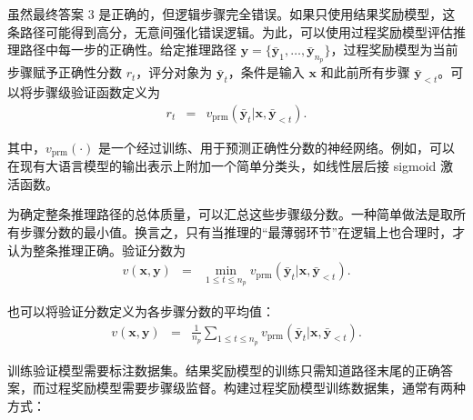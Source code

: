 虽然最终答案 $3$ 是正确的，但逻辑步骤完全错误。如果只使用结果奖励模型，这条路径可能得到高分，无意间强化错误逻辑。为此，可以使用过程奖励模型评估推理路径中每一步的正确性。给定推理路径 $\mathbf{y} = \{\bar{\mathbf{y}}_1, \dots, \bar{\mathbf{y}}_{n_p}\}$，过程奖励模型为当前步骤赋予正确性分数 $r_t$，评分对象为 $\bar{\mathbf{y}}_t$，条件是输入 $\mathbf{x}$ 和此前所有步骤 $\bar{\mathbf{y}}_{<t}$。可以将步骤级验证函数定义为
\begin{eqnarray}
r_t & = & v_{\mathrm{prm}}(\bar{\mathbf{y}}_t | \mathbf{x}, \bar{\mathbf{y}}_{<t}).
\end{eqnarray}

\noindent 其中，$v_{\mathrm{prm}}(\cdot)$ 是一个经过训练、用于预测正确性分数的神经网络。例如，可以在现有大语言模型的输出表示上附加一个简单分类头，如线性层后接 sigmoid 激活函数。

为确定整条推理路径的总体质量，可以汇总这些步骤级分数。一种简单做法是取所有步骤分数的最小值。换言之，只有当推理的“最薄弱环节”在逻辑上也合理时，才认为整条推理正确。验证分数为
\begin{eqnarray}
v(\mathbf{x}, \mathbf{y}) & = & \min_{1 \le t \le n_p} v_{\mathrm{prm}}(\bar{\mathbf{y}}_t | \mathbf{x}, \bar{\mathbf{y}}_{<t}).
\end{eqnarray}

\noindent 也可以将验证分数定义为各步骤分数的平均值：
\begin{eqnarray}
v(\mathbf{x}, \mathbf{y}) & = & \frac{1}{n_p}\sum_{1 \le t \le n_p} v_{\mathrm{prm}}(\bar{\mathbf{y}}_t | \mathbf{x}, \bar{\mathbf{y}}_{<t}).
\end{eqnarray}

训练验证模型需要标注数据集。结果奖励模型的训练只需知道路径末尾的正确答案，而过程奖励模型需要步骤级监督。构建过程奖励模型训练数据集，通常有两种方式：

